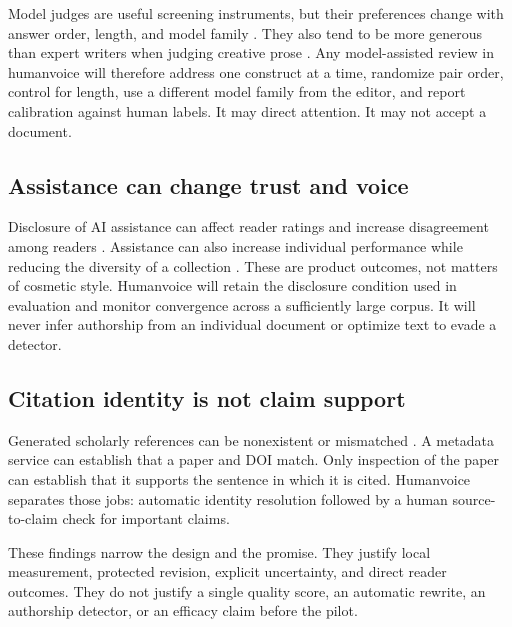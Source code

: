 \documentclass[
  11pt,
  english,
]{article}
\begin{document}
Model judges are useful screening instruments, but their preferences
change with answer order, length, and model family
\citep{zheng2023judging, panickssery2024llm, dubois2024length}. They
also tend to be more generous than expert writers when judging creative
prose \citep{chakrabarty2024art}. Any model-assisted review in
humanvoice will therefore address one construct at a time, randomize
pair order, control for length, use a different model family from the
editor, and report calibration against human labels. It may direct
attention. It may not accept a document.

\hypertarget{assistance-can-change-trust-and-voice}{%
\subsection{Assistance can change trust and
voice}\label{assistance-can-change-trust-and-voice}}

Disclosure of AI assistance can affect reader ratings and increase
disagreement among readers \citep{li2024disclosure}. Assistance can also
increase individual performance while reducing the diversity of a
collection \citep{doshi2024generative, padmakumar2024writing}. These are
product outcomes, not matters of cosmetic style. Humanvoice will retain
the disclosure condition used in evaluation and monitor convergence
across a sufficiently large corpus. It will never infer authorship from
an individual document or optimize text to evade a detector.

\hypertarget{citation-identity-is-not-claim-support}{%
\subsection{Citation identity is not claim
support}\label{citation-identity-is-not-claim-support}}

Generated scholarly references can be nonexistent or mismatched
\citep{mugaanyi2024citation}. A metadata service can establish that a
paper and DOI match. Only inspection of the paper can establish that it
supports the sentence in which it is cited. Humanvoice separates those
jobs: automatic identity resolution followed by a human source-to-claim
check for important claims.

These findings narrow the design and the promise. They justify local
measurement, protected revision, explicit uncertainty, and direct reader
outcomes. They do not justify a single quality score, an automatic
rewrite, an authorship detector, or an efficacy claim before the pilot.
\end{document}
